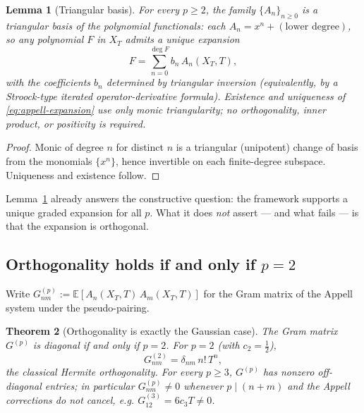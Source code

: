 \documentclass[11pt,reqno]{amsart}
\theoremstyle{plain}
\newtheorem{theorem}{Theorem}[section]
\newtheorem{lemma}[theorem]{Lemma}
\theoremstyle{definition}
\newcommand{\E}{\mathbb{E}}
\begin{document}
\begin{lemma}[Triangular basis]
\label{lem:triangular}
For every $p \geq 2$, the family $\{A_n\}_{n \geq 0}$ is a triangular basis of the polynomial functionals: each $A_n = x^n + (\text{lower degree})$, so any polynomial $F$ in $X_T$ admits a unique expansion
\begin{equation}
\label{eq:appell-expansion}
F = \sum_{n=0}^{\deg F} b_n\, A_n(X_T, T),
\end{equation}
with the coefficients $b_n$ determined by triangular inversion (equivalently, by a Stroock-type iterated operator-derivative formula). Existence and uniqueness of \eqref{eq:appell-expansion} use only monic triangularity; no orthogonality, inner product, or positivity is required.
\end{lemma}

\begin{proof}
Monic of degree $n$ for distinct $n$ is a triangular (unipotent) change of basis from the monomials $\{x^n\}$, hence invertible on each finite-degree subspace. Uniqueness and existence follow.
\end{proof}

Lemma~\ref{lem:triangular} already answers the constructive question: the framework supports a unique graded expansion for all $p$. What it does \emph{not} assert --- and what fails --- is that the expansion is orthogonal.

\subsection{Orthogonality holds if and only if \texorpdfstring{$p=2$}{p=2}}

Write $G^{(p)}_{nm} := \E[A_n(X_T,T)\,A_m(X_T,T)]$ for the Gram matrix of the Appell system under the pseudo-pairing.

\begin{theorem}[Orthogonality is exactly the Gaussian case]
\label{thm:ortho-iff}
The Gram matrix $G^{(p)}$ is diagonal if and only if $p=2$. For $p=2$ (with $c_2=\tfrac12$),
\begin{equation}
G^{(2)}_{nm} = \delta_{nm}\, n!\, T^n,
\end{equation}
the classical Hermite orthogonality. For every $p \geq 3$, $G^{(p)}$ has nonzero off-diagonal entries; in particular $G^{(p)}_{nm} \neq 0$ whenever $p \mid (n+m)$ and the Appell corrections do not cancel, e.g. $G^{(3)}_{12} = 6 c_3 T \neq 0$.
\end{theorem}
\end{document}
